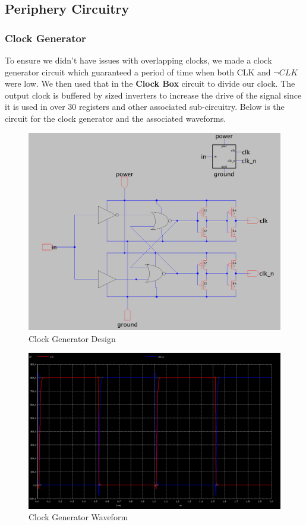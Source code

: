 \documentclass[a4paper]{article}
\begin{document}
\subsection{Periphery Circuitry}

\subsubsection{Clock Generator}
\label{sec:clock_generator_design}

To ensure we didn't have issues with overlapping clocks, we made a clock generator circuit which guaranteed a period of time when both $\text{CLK and } \neg{CLK}$ were low. We then used that in the \textbf{Clock Box} circuit to divide our clock. The output clock is buffered by sized inverters to increase the drive of the signal since it is used in over 30 registers and other associated sub-circuitry. Below is the circuit for the clock generator and the associated waveforms.

\begin{figure}[H]
	\centering
	\includegraphics[scale=0.26]{clockGen}
	\caption{Clock Generator Design}
	\label{fig:clockGen}
\end{figure}

\begin{figure}[H]
	\centering
	\includegraphics[scale=0.26]{clockGenWave}
	\caption{Clock Generator Waveform}
	\label{fig:clockGenWave}
\end{figure}
\end{document}
